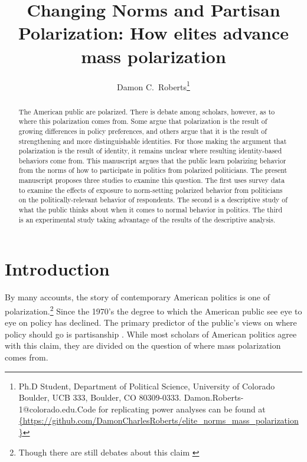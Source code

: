 \documentclass [12pt]{article}
\title{Changing Norms and Partisan Polarization: How elites advance mass polarization}
\author{Damon C.\ Roberts\footnote{Ph.D Student,
Department of Political Science, University of Colorado Boulder, UCB 333, Boulder, CO 80309-0333. Damon.Roberts-1@colorado.edu.\newline Code for replicating power analyses can be found at \url{{https://github.com/DamonCharlesRoberts/elite_norms_mass_polarization}}}}
\date{}
\begin{document}
\maketitle
\begin{abstract}
The American public are polarized. There is debate among scholars, however, as to where this polarization comes from. Some argue that polarization is the result of growing differences in policy preferences, and others argue that it is the result of strengthening and more distinguishable identities. For those making the argument that polarization is the result of identity, it remains unclear where resulting identity-based behaviors come from. This manuscript argues that the public learn polarizing behavior from the norms of how to participate in politics from polarized politicians. The present manuscript proposes three studies to examine this question. The first uses survey data to examine the effects of exposure to norm-setting polarized behavior from politicians on the politically-relevant behavior of respondents. The second is a descriptive study of what the public thinks about when it comes to normal behavior in politics. The third is an experimental study taking advantage of the results of the descriptive analysis. 
\end{abstract}

\newpage
\doublespace
\newpage 
\section{Introduction}
By many accounts, the story of contemporary American politics is one of polarization.\footnote{Though there are still debates about this claim \citep[see][for a discussion of this debate]{iyengar_et-al_2012}} Since the 1970's the degree to which the American public see eye to eye on policy has declined. The primary predictor of the public's views on where policy should go is partisanship \citep[Chapter 6]{campbell_et-al_1969}. While most scholars of American politics agree with this claim, they are divided on the question of where mass polarization comes from. 

\end{document}
